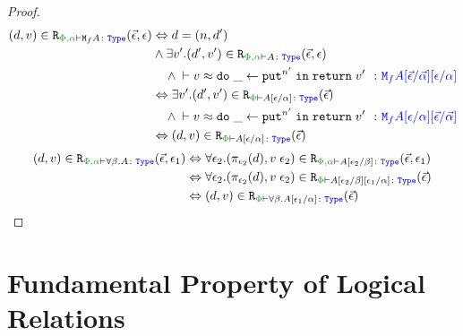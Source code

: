 \begin{framed}
\begin{proof}
            \begin{align*}
                \inLogRel{d}{v}{\P,\a}{\M{f}{A}}{\ev, \e} & \Leftrightarrow d= (n, d')
                \\ & \wedge \exists v'. \inLogRel{d'}{v'}{\P,\a}{A}{\ev, \e}
                \\ & \quad\wedge  \zberelation{v}{\doin{\_}{\put^{n'}}{\return{v'}}}{\M{f}{A}\ssub{\av}{\ev}\ssub{\a}{\e}}
                \\ & \Leftrightarrow \exists v'. \inLogRelPE{d'}{v'}{A\ssub{\a}{\e}}
                \\ & \quad\wedge  \zberelation{v}{\doin{\_}{\put^{n'}}{\return{v'}}}{\M{f}{A}\ssub{\a}{\e}\ssub{\av}{\ev}}
                \\ & \Leftrightarrow \inLogRelPE{d}{v}{A\ssub{\a}{\e}}
            \end{align*}
        \case{\tquant}
        \begin{align*}
            \inLogRel{d}{v}{\P,\a}{\all{\b}{A}}{\ev, \e_1} & \Leftrightarrow \forall \e_2. \inLogRel{\pi_{\e_2}(d)}{\eapp{v}{\e_2}}{\P,\a}{A\ssub{\b}{\e_2}}{\ev, \e_1}
            \\
            & \Leftrightarrow \forall \e_2. \inLogRelPE{\pi_{\e_2}(d)}{\eapp{v}{\e_2}}{A\ssub{\b}{\e_2}\ssub{\a}{\e_1}}
            \\
            & \Leftrightarrow \inLogRelPE{d}{v}{\all{\b}{A\ssub{\a}{\e_1}}}
        \end{align*}
        
    \end{proof}      
\end{framed}

\section{Fundamental Property of Logical Relations}
\label{AdequacyFundamentalPropertyProof}


